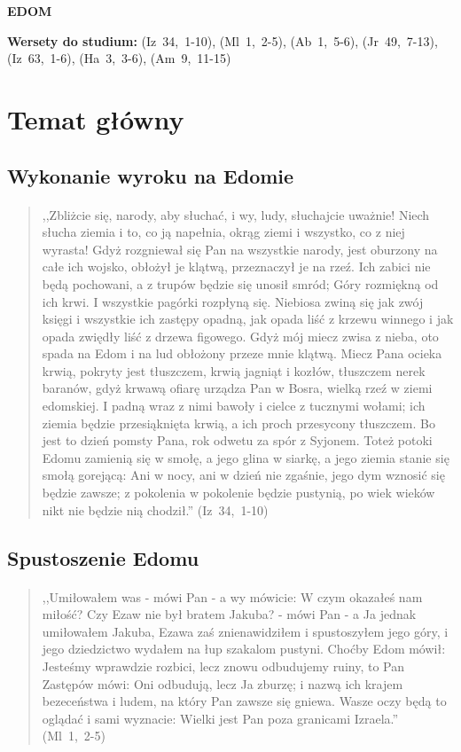 \documentclass[10pt,a4paper,oneside]{article}
\begin{document}
\centerline{\textbf{\MakeUppercase{Edom}}}
\begin{center}
\textbf{Wersety do studium:} 
\mbox{(Iz 34, 1-10)}, \mbox{(Ml 1, 2-5)}, \mbox{(Ab 1, 5-6)}, \mbox{(Jr 49, 7-13)}, \mbox{(Iz 63, 1-6)}, \mbox{(Ha 3, 3-6)}, \mbox{(Am 9, 11-15)}
\end{center}
\section{Temat główny}
\subsection{Wykonanie wyroku na Edomie}
\paragraph{}
\begin{quote}
,,Zbliżcie się, narody, aby słuchać, i wy, ludy, słuchajcie uważnie! Niech słucha ziemia i to, co ją napełnia, okrąg ziemi i wszystko, co z niej wyrasta! Gdyż rozgniewał się Pan na wszystkie narody, jest oburzony na całe ich wojsko, obłożył je klątwą, przeznaczył je na rzeź. Ich zabici nie będą pochowani, a z trupów będzie się unosił smród; Góry rozmiękną od ich krwi. I wszystkie pagórki rozpłyną się. Niebiosa zwiną się jak zwój księgi i wszystkie ich zastępy opadną, jak opada liść z krzewu winnego i jak opada zwiędły liść z drzewa figowego. Gdyż mój miecz zwisa z nieba, oto spada na Edom i na lud obłożony przeze mnie klątwą. Miecz Pana ocieka krwią, pokryty jest tłuszczem, krwią jagniąt i kozłów, tłuszczem nerek baranów, gdyż krwawą ofiarę urządza Pan w Bosra, wielką rzeź w ziemi edomskiej. I padną wraz z nimi bawoły i cielce z tucznymi wołami; ich ziemia będzie przesiąknięta krwią, a ich proch przesycony tłuszczem. Bo jest to dzień pomsty Pana, rok odwetu za spór z Syjonem. Toteż potoki Edomu zamienią się w smołę, a jego glina w siarkę, a jego ziemia stanie się smołą gorejącą: Ani w nocy, ani w dzień nie zgaśnie, jego dym wznosić się będzie zawsze; z pokolenia w pokolenie będzie pustynią, po wiek wieków nikt nie będzie nią chodził.'' \mbox{(Iz 34, 1-10)}
\end{quote}
\subsection{Spustoszenie Edomu}
\paragraph{}
\begin{quote}
,,Umiłowałem was - mówi Pan - a wy mówicie: W czym okazałeś nam miłość? Czy Ezaw nie był bratem Jakuba? - mówi Pan - a Ja jednak umiłowałem Jakuba, Ezawa zaś znienawidziłem i spustoszyłem jego góry, i jego dziedzictwo wydałem na łup szakalom pustyni. Choćby Edom mówił: Jesteśmy wprawdzie rozbici, lecz znowu odbudujemy ruiny, to Pan Zastępów mówi: Oni odbudują, lecz Ja zburzę; i nazwą ich krajem bezeceństwa i ludem, na który Pan zawsze się gniewa. Wasze oczy będą to oglądać i sami wyznacie: Wielki jest Pan poza granicami Izraela.'' \mbox{(Ml 1, 2-5)}
\end{quote}
\end{document}
